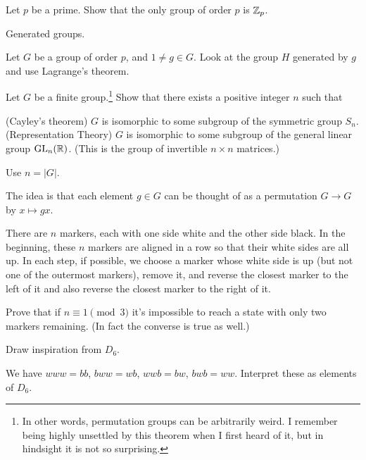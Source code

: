 \begin{sproblem}
	Let $p$ be a prime.
	Show that the only group of order $p$ is $\mathbb Z_{p}$.
	\begin{hint}
		Generated groups.
	\end{hint}
	\begin{sol}
		Let $G$ be a group of order $p$, and $1 \neq g \in G$.
		Look at the group $H$ generated by $g$ and use Lagrange's theorem.
	\end{sol}
\end{sproblem}

\begin{dproblem}
	\gim
	Let $G$ be a finite group.\footnote{In other words,
		permutation groups can be arbitrarily weird.
		I remember being highly unsettled
		by this theorem when I first heard of it,
		but in hindsight it is not so surprising.}
	Show that there exists a positive integer $n$ such that
	\begin{enumerate}[(a)]
		\ii (Cayley's theorem) $G$ is isomorphic to some subgroup of the symmetric group $S_n$.
		\ii (Representation Theory) $G$ is isomorphic to some subgroup of
		the general linear group $\operatorname{GL}_n(\mathbb R)$.
		(This is the group of invertible $n \times n$ matrices.)
	\end{enumerate}
	\label{thm:cayley_theorem}
	\begin{hint}
		Use $n = \left\lvert G \right\rvert$.
	\end{hint}
	\begin{sol}
		The idea is that each element $g \in G$ can be thought of as a permutation
		$G \to G$ by $x \mapsto gx$.
	\end{sol}
\end{dproblem}

\begin{problem}
	[IMO SL 2005 C5] \gim
	There are $n$ markers, each with one side white and the other side black.
	In the beginning, these $n$ markers are aligned in a row so that their white sides are all up.
	In each step, if possible, we choose a marker whose white side is up
	(but not one of the outermost markers),
	remove it, and reverse the closest marker to the left of it
	and also reverse the closest marker to the right of it.
	
	Prove that if $n \equiv 1 \pmod 3$ it's impossible to reach a state
	with only two markers remaining.
	(In fact the converse is true as well.)
	\begin{hint}
		Draw inspiration from $D_6$.
	\end{hint}
	\begin{sol}
		We have $www = bb$, $bww = wb$, $wwb = bw$, $bwb = ww$.
		Interpret these as elements of $D_6$.
	\end{sol}
\end{problem}


